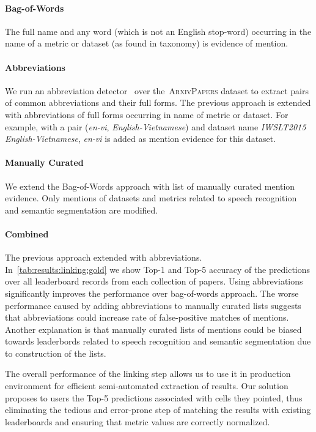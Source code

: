 \documentclass[11pt,a4paper]{article}
\newcommand{\unlabeled}{\textsc{ArxivPapers}}
\begin{document}
\paragraph{Bag-of-Words} The full name and any word (which is not an English stop-word) occurring in the name of a metric or dataset (as found in taxonomy) is evidence of mention.
\paragraph{Abbreviations} We run an abbreviation detector~\cite{scispacy} over the~\unlabeled{} dataset to extract pairs of common abbreviations and their full forms. The previous approach is extended with abbreviations of full forms occurring in name of metric or dataset. For example, with a pair (\textit{en-vi}, \textit{English-Vietnamese}) and dataset name \textit{IWSLT2015 English-Vietnamese}, \textit{en-vi} is added as mention evidence for this dataset.
\paragraph{Manually Curated} We extend the Bag-of-Words approach with list of manually curated mention evidence. Only mentions of datasets and metrics related to speech recognition and semantic segmentation are modified.
\paragraph{Combined} The previous approach extended with abbreviations.\\

In~\cref{tab:results:linking:gold} we show Top-1 and Top-5 accuracy of the predictions over all leaderboard records from each collection of papers. Using abbreviations significantly improves the performance over bag-of-words approach. The worse performance caused by adding abbreviations to manually curated lists suggests that abbreviations could increase rate of false-positive matches of mentions. Another explanation is that manually curated lists of mentions could be biased towards leaderbords related to speech recognition and semantic segmentation due to construction of the lists.

The overall performance of the linking step allows us to use it in production environment for efficient semi-automated extraction of results. Our solution proposes to users the Top-5 predictions associated with cells they pointed, thus eliminating the tedious and error-prone step of matching the results with existing leaderboards and ensuring that metric values are correctly normalized.
\end{document}
